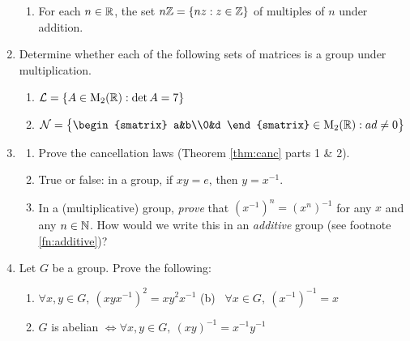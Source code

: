 \begin{exercises}
\begin{enumerate}
\begin{enumerate}
		  \item\label{exs:nzgroup} For each $n\in\mathbb{R}$, the set $n\mathbb{Z}=\{nz:z\in\mathbb{Z}\}$ of multiples of $n$ under addition.
	  \end{enumerate}
	  
	  
	  \item Determine whether each of the following sets of matrices is a group under multiplication.
	  \begin{enumerate}
	    \item {} $\mathcal L=\{A\in \mathrm{M}_2(\mathbb{R}):\det A=7\}$\setcounter{enumii}{2}
	    
	    \item $\mathcal N=\bigl\{\begin{smatrix}
	    a&b\\0&d
	    \end{smatrix}\in\rM_2(\R):ad\neq 0\bigr\}$
	  \end{enumerate}
	
	  
	  \item\begin{enumerate}
	    \item Prove the cancellation laws (Theorem \ref{thm:canc} parts 1 \& 2).
	    
	    \item True or false: in a group, if $xy=e$, then $y=x^{-1}$.
	    
	    \item\label{exs:multinverse2} In a (multiplicative) group, \emph{prove} that $(x^{-1})^n=(x^n)^{-1}$ for any $x$ and any $n\in\mathbb{N}$. How would we write this in an \emph{additive} group (see footnote \ref{fn:additive})?
	  \end{enumerate}
	    
	    
	  \item Let $G$ be a group. Prove the following:\vspace{-6pt}
	  \begin{enumerate}
	    \item $\forall x,y\in G,\ (xy x^{-1})^2=xy^2x^{-1}$
	    \qquad\qquad
	    (b) \ $\forall x\in G,\ (x^{-1})^{-1}=x$
	    \setcounter{enumii}{2}
	    
	    \item $G$ is abelian $\iff\forall x,y\in G,\ (xy)^{-1}=x^{-1}y^{-1}$
	  \end{enumerate}
	  
	  
	

\end{enumerate}
\end{exercises}
